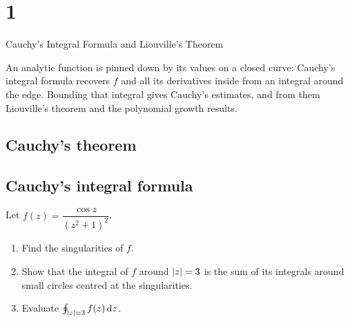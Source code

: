 \chapter{1}{Cauchy's Integral Formula and Liouville's Theorem}

An analytic function is pinned down by its values on a closed curve: Cauchy's
integral formula recovers $f$ and all its derivatives inside from an integral
around the edge. Bounding that integral gives Cauchy's estimates, and from
them Liouville's theorem and the polynomial growth results.

\section{Cauchy's theorem}\label{sec:cauchy-theorem}





\section{Cauchy's integral formula}\label{sec:cif}




\begin{exercise}\label{ex:cos-over-square}
  Let $f(z) = \dfrac{\cos z}{(z^2 + 1)^2}$.
  \begin{enumerate}[label=(\alph*)]
    \item Find the singularities of $f$.
    \item Show that the integral of $f$ around $\lvert z\rvert = 3$ is the sum of
      its integrals around small circles centred at the singularities.
    \item Evaluate $\oint_{\lvert z\rvert = 3} f(z) \mathop{}\!\mathrm{d} z$.
  \end{enumerate}
\end{exercise}

